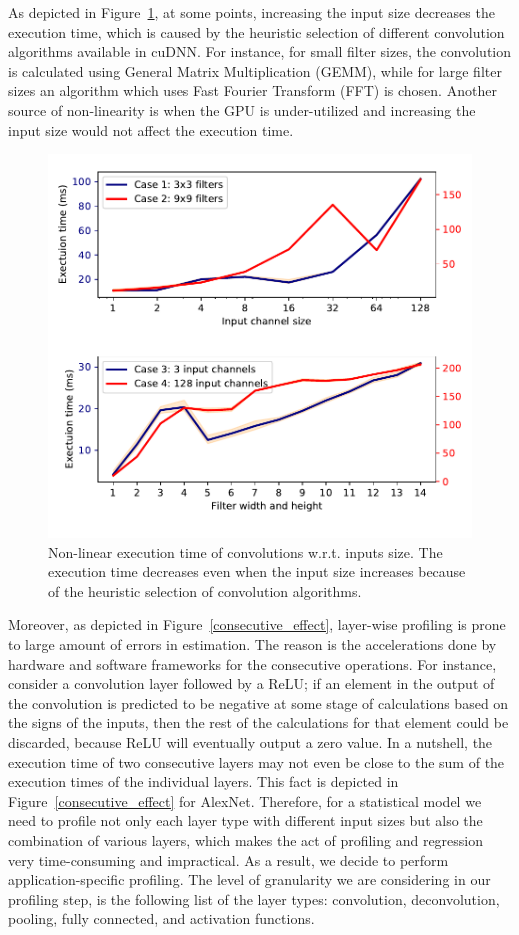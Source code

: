 \documentclass[conference,9pt]{IEEEtran}
\begin{document}
As depicted in Figure~\ref{non-linear-conv}, at some points, increasing the input size decreases the execution time, which is caused by the heuristic selection of different convolution algorithms available in cuDNN\cite{b12}. For instance, for small filter sizes, the convolution is calculated using General Matrix Multiplication (GEMM), while for large filter sizes an algorithm which uses Fast Fourier Transform (FFT) is chosen. Another source of non-linearity is when the GPU is under-utilized and increasing the input size would not affect the execution time.
\begin{figure}[ht]
\centerline{\includegraphics[width=\columnwidth]{convolution_nonlinear_et.pdf}}
\caption{Non-linear execution time of convolutions w.r.t. inputs size. The execution time decreases even when the input size increases because of the heuristic selection of convolution algorithms.}
\label{non-linear-conv}
\end{figure}
Moreover, as depicted in Figure~\ref{consecutive_effect}, layer-wise profiling is prone to large amount of errors in estimation. The reason is the accelerations done by hardware and software frameworks for the consecutive operations. For instance, consider a convolution layer followed by a ReLU\cite{b20}; if an element in the output of the convolution is predicted to be negative at some stage of calculations based on the signs of the inputs, then the rest of the calculations for that element could be discarded, because ReLU will eventually output a zero value. In a nutshell, the execution time of two consecutive layers may not even be close to the sum of the execution times of the individual layers. This fact is depicted in Figure~\ref{consecutive_effect} for AlexNet\cite{b1}. Therefore, for a statistical model we need to profile not only each layer type with different input sizes but also the combination of various layers, which makes the act of profiling and regression very time-consuming and impractical. As a result, we decide to perform application-specific profiling. The level of granularity we are considering in our profiling step, is the following list of the layer types: convolution, deconvolution, pooling, fully connected, and activation functions. 
\end{document}
